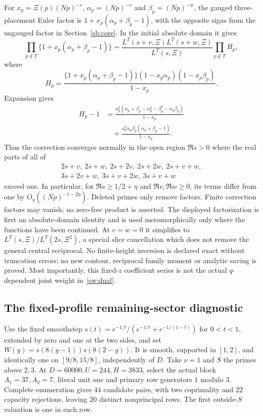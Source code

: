 For $x_p=\Xi(p)(Np)^{-s}$, $\alpha_p=(Np)^{-v}$ and
$\beta_p=(Np)^{-w}$, the gauged three-placement Euler factor is
$1+x_p(\alpha_p+\beta_p-1)$, with the opposite signs from the ungauged
factor in Section~\ref{sb:core}. In the initial absolute domain it gives
\[
 \prod_{p\notin T}\{1+x_p(\alpha_p+\beta_p-1)\}
 =\frac{L^T(s+v,\Xi)L^T(s+w,\Xi)}{L^T(s,\Xi)}\prod_{p\notin T}H_p,
\]
where
\[
 H_p=\frac{\{1+x_p(\alpha_p+\beta_p-1)\}
                 (1-x_p\alpha_p)(1-x_p\beta_p)}{1-x_p}.
\]
Expansion gives
\begin{align*}
 H_p-1&=\frac{x_p^2(\alpha_p+\beta_p-\alpha_p^2-\beta_p^2-\alpha_p\beta_p)}{1-x_p}\\
 &\quad+\frac{x_p^3\alpha_p\beta_p(\alpha_p+\beta_p-1)}{1-x_p}.
\end{align*}
Thus the correction converges normally in the open region $\Re s>0$
where the real parts of all of
\[
 \begin{gathered}
 2s+v,\ 2s+w,\ 2s+2v,\ 2s+2w,\ 2s+v+w,\\
 3s+2v+w,\ 3s+v+2w,\ 3s+v+w
 \end{gathered}
\]
exceed one. In particular, for $\Re s\ge1/2+\eta$ and
$\Re v,\Re w\ge0$, its terms differ from one by
$O_\eta((Np)^{-1-2\eta})$. Deleted primes only remove factors.
Finite correction factors may vanish; no zero-free product is asserted.
The displayed factorization is first an absolute-domain identity and is
used meromorphically only where the functions have been continued.
At $v=w=0$ it simplifies to $L^T(s,\Xi)/L^T(2s,\Xi^2)$, a special
slice cancellation which does not remove the general central reciprocal.
No finite-height inversion is declared exact without truncation errors;
no new contour, reciprocal family moment or analytic saving is proved.
Most importantly, this fixed-$z$ coefficient series is not the actual
$q$-dependent joint weight in~\eqref{sw:dual}.

\subsection{The fixed-profile remaining-sector diagnostic}
Use the fixed smoothstep $s(t)=e^{-1/t}/(e^{-1/t}+e^{-1/(1-t)})$ for
$0<t<1$, extended by zero and one at the two sides, and set
$W(y)=s(8(y-1))s(8(2-y))$. It is smooth, supported in $[1,2]$, and
identically one on $[9/8,15/8]$, independently of $D$.
Take $\nu=1$ and $S$ the primes above $2,3$.
At $D=60000,U=244,H=3833$, select the actual block $A_1=37,A_2=7$,
literal unit one and primary row generators $1$ modulo $3$. Complete enumeration gives $44$ candidate pairs,
with two coprimality and $22$ capacity rejections, leaving $20$ distinct
nonprincipal rows. The first outside-$S$ valuation is one in each row.

